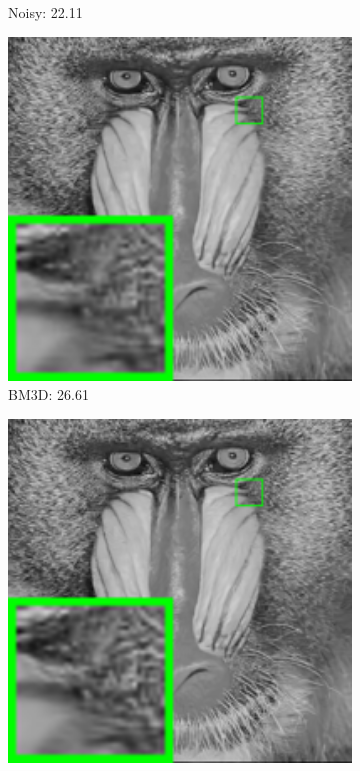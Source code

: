 \begin{figure}
\begin{adjustwidth}{-2cm}{}
\begin{subfigure}[t]{0.19\textwidth}
		\caption{Noisy: 22.11}
    \end{subfigure}
    \hfill
    \begin{subfigure}[t]{0.19\textwidth}
        \centering
        \includegraphics[width=1\textwidth]{images/twsc/awgn/resize_br_BM3D_20_baboon.png}
		\caption{BM3D: 26.61}
    \end{subfigure}
    \hfill
    \begin{subfigure}[t]{0.19\textwidth}
        \centering
        \includegraphics[width=1\textwidth]{images/twsc/awgn/resize_br_LSSC_20_baboon.png}

\end{subfigure}
\end{adjustwidth}
\end{figure}
